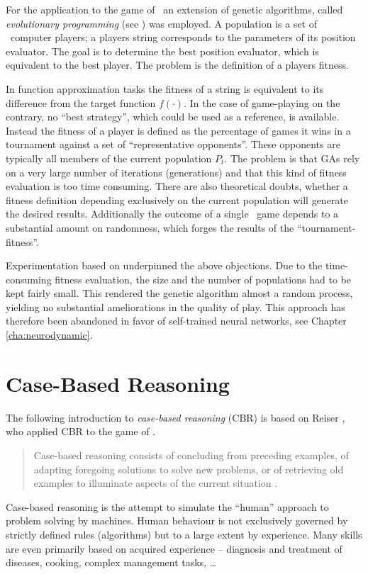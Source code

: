 For the application to the game of \Abalone\, an extension of genetic algorithms, called \emph{evolutionary programming} (see \cite{Michalewicz96}) was employed. A population is a set of \Abalone\ computer players; a players string corresponds to the parameters of its position evaluator. The goal is to determine the best position evaluator, which is equivalent to the best player. The problem is the definition of a players fitness. 

In function approximation tasks the fitness of a string is equivalent to its difference from the target function $f(\cdot)$. In the case of game-playing on the contrary, no ``best strategy'', which could be used as a reference, is available. Instead the fitness of a player is defined as the percentage of games it wins in a tournament against a set of ``representative opponents''. These opponents are typically all members of the current population $P_t$. The problem is that GAs rely on a very large number of iterations (generations) and that this kind of fitness evaluation is too time consuming. There are also theoretical doubts, whether a fitness definition depending exclusively on the current population will generate the desired results. Additionally the outcome of a single \Abalone\ game depends to a substantial amount on randomness, which forges the results of the ``tournament-fitness''. 

Experimentation based on \cite{Galib} underpinned the above objections. Due to the time-consuming fitness evaluation, the size and the number of populations had to be kept fairly small. This rendered the genetic algorithm almost a random process, yielding no substantial ameliorations in the quality of play. This approach has therefore been abandoned in favor of self-trained neural networks, see Chapter \ref{cha:neurodynamic}.








\section{Case-Based Reasoning} 
The following introduction to \emph{case-based reasoning} (CBR) is based on Reiser \cite{Reiser94}, who applied CBR to the game of \Abalone.  
\begin{quote}
Case-based reasoning consists of concluding from preceding examples, of adapting  foregoing solutions to solve new problems, or of retrieving old examples to illuminate aspects of the current situation \cite{Kolodner89}.
\end{quote}
Case-based reasoning is the attempt to simulate the ``human'' approach to problem solving by machines. Human behaviour is not exclusively governed by strictly defined rules (algorithms) but to a large extent by experience. Many skills are even primarily based on acquired experience -- diagnosis and treatment of diseases, cooking, complex management tasks, \ldots 


